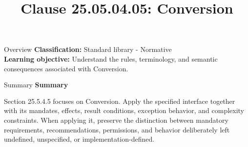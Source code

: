 \documentclass[10pt,letterpaper]{article}
\title{Clause 25.05.04.05: Conversion}
\author{}
\date{}
\begin{document}
\maketitle
\begin{CornellOverviewBox}{Overview}
\textbf{Classification:} Standard library - Normative\\[2pt]
\textbf{Learning objective:} Understand the rules, terminology, and semantic consequences associated with Conversion.
\end{CornellOverviewBox}\begin{CornellSummaryBox}{Summary}
{\sffamily\bfseries\color{Accent} Summary}\par\vspace{3pt}Section 25.5.4.5 focuses on Conversion. Apply the specified interface together with its mandates, effects, result conditions, exception behavior, and complexity constraints. When applying it, preserve the distinction between mandatory requirements, recommendations, permissions, and behavior deliberately left undefined, unspecified, or implementation-defined.
\end{CornellSummaryBox}
\end{document}
